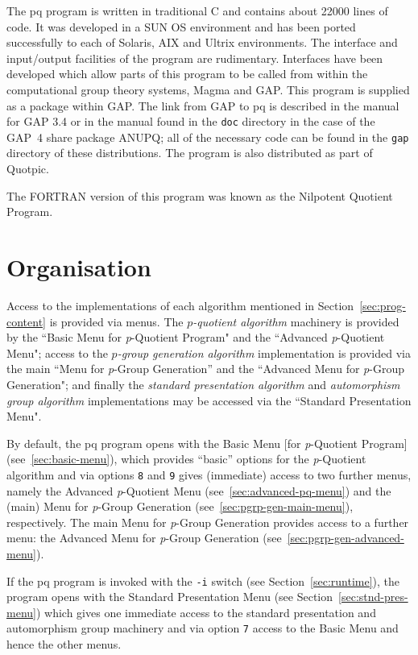 \documentclass[12pt]{article}
\begin{document}
The pq program is written in traditional C and contains about 
22000 lines of code.
It was developed in a SUN OS environment and has been ported successfully
to each of Solaris, AIX and Ultrix environments.  The interface and 
input/output facilities of the program are rudimentary.  Interfaces 
have been developed which allow parts of this program to be called
from within the computational group theory systems, 
{\sc Magma} and {\sf GAP}.  
This program is supplied as a package within {\sf GAP}.
The link from {\sf GAP} to pq is described in the manual
for {\sf GAP} 3.4 or in the manual found in the \texttt{doc} directory
in the case of the {\sf GAP}~4 share package {\sf ANUPQ}; all of the 
necessary code can be found in the \texttt{gap} directory of these 
distributions.
The program is also distributed as part of Quotpic.

The FORTRAN version of this program was known as the 
Nilpotent Quotient Program.

\section{Organisation}
Access to the implementations of each algorithm mentioned in
Section~\ref{sec:prog-content} is provided via menus. 
The \emph{$p$-quotient algorithm} machinery is provided by the
``Basic Menu for {\it p}-Quotient Program" and
the ``Advanced {\it p}-Quotient Menu";
access to the \emph{$p$-group generation algorithm} implementation is
provided via the main ``Menu for {\it p}-Group Generation'' and the
``Advanced Menu for {\it p}-Group Generation"; and finally the
\emph{standard presentation algorithm} and \emph{automorphism group algorithm}
implementations may be accessed via the ``Standard Presentation Menu".

By default, the pq program opens with the Basic Menu [for {\it p}-Quotient
Program] (see~\ref{sec:basic-menu}), which provides ``basic'' options for
the {\it p}-Quotient algorithm and via options \texttt{8} and \texttt{9}
gives (immediate) access to two further menus, 
namely the Advanced {\it p}-Quotient Menu 
(see~\ref{sec:advanced-pq-menu}) and the (main) 
Menu for {\it p}-Group Generation (see~\ref{sec:pgrp-gen-main-menu}),
respectively. The main Menu for {\it p}-Group Generation provides
access to a further menu: the Advanced Menu for {\it p}-Group Generation 
(see~\ref{sec:pgrp-gen-advanced-menu}).

If the pq program is invoked with the \texttt{-i} switch (see
Section~\ref{sec:runtime}), the program opens with the 
Standard Presentation Menu (see Section~\ref{sec:stnd-pres-menu}) 
which gives one immediate access to the 
standard presentation and automorphism group machinery
and via option \texttt{7} access to the Basic Menu
and hence the other menus.
\end{document}
